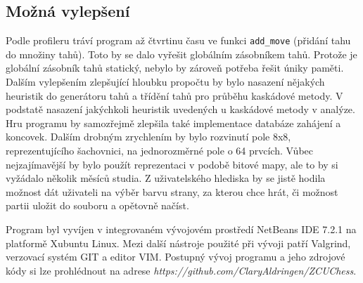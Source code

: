 \documentclass[11pt, titlepage]{article}
\begin{document}
\subsection{Možná vylepšení}
Podle profileru tráví program až čtvrtinu času ve funkci {\tt add\_move} (přidání tahu do množiny tahů). Toto by se dalo vyřešit globálním zásobníkem tahů. Protože je globální zásobník tahů statický, nebylo by zároveň potřeba řešit úniky paměti.
Dalším vylepšením zlepšující hloubku propočtu by bylo nasazení nějakých heuristik do generátoru tahů a třídění tahů pro průběhu kaskádové metody. V podstatě nasazení jakýchkoli heuristik uvedených u kaskádové metody v analýze.
Hru programu by samozřejmě zlepšila také implementace databáze zahájení a koncovek.
Dalším drobným zrychlením by bylo rozvinutí pole 8x8, reprezentujícího šachovnici, na jednorozměrné pole o 64 prvcích. Vůbec nejzajímavější by bylo použít reprezentaci v podobě bitové mapy, ale to by si vyžádalo několik měsíců studia.
Z uživatelského hlediska by se jistě hodila možnost dát uživateli na výběr barvu strany, za kterou chce hrát, či možnost partii uložit do souboru a opětovně načíst.

Program byl vyvíjen v integrovaném vývojovém prostředí NetBeans IDE 7.2.1 na platformě Xubuntu Linux. Mezi další nástroje použité při vývoji patří Valgrind, verzovací systém GIT a editor VIM.
Postupný vývoj programu a jeho zdrojové kódy si lze prohlédnout na adrese { \it https://github.com/ClaryAldringen/ZCUChess}.
\end{document}
